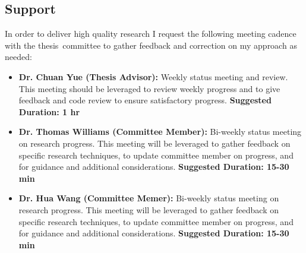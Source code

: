 \documentclass[letterpaper,12pt]{article}
\begin{document}
\subsection{Support}
In order to deliver high quality research I request the following meeting cadence with the thesis\
committee to gather feedback and correction on my approach as needed:
\begin{itemize}
	\item \textbf{Dr. Chuan Yue (Thesis Advisor): } Weekly status meeting and review. This meeting should be leveraged to review weekly progress and to give feedback and code review to ensure satisfactory progress. \textbf{Suggested Duration: 1 hr}
	\item \textbf{Dr. Thomas Williams (Committee Member):} Bi-weekly status meeting on research progress. This meeting will be leveraged to gather feedback on specific research techniques, to update committee member on progress, and for guidance and additional considerations. \textbf{Suggested Duration: 15-30 min}
	\item \textbf{Dr. Hua Wang (Committee Memer): } Bi-weekly status meeting on research progress. This meeting will be leveraged to gather feedback on specific research techniques, to update committee member on progress, and for guidance and additional considerations. \textbf{Suggested Duration: 15-30 min}
\end{itemize}



\end{document}
